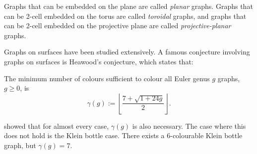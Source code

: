 Graphs that can be embedded on the plane are called \textit{planar} graphs. Graphs that can be 2-cell embedded on the torus are called \textit{toroidal} graphs, and graphs that can be 2-cell embedded on the projective plane are called \textit{projective-planar} graphs.


Graphs on surfaces have been studied extensively. A famous conjecture involving graphs on surfaces is Heawood's conjecture, which states that:
\begin{theorem}
	The minimum number of colours sufficient to colour all Euler genus $g$ graphs, $g \geq 0$, is
	\begin{equation*}
		\gamma(g) := \left\lfloor 
		\frac{7 + \sqrt{1 + 24g}}{2}
		\right\rfloor.
	\end{equation*}
\end{theorem}
\textcite{ringelMapColorTheorem1974} showed that for almost every case, $\gamma(g)$ is also necessary. The case where this does not hold is the Klein bottle case. There exists a 6-colourable Klein bottle graph, but $\gamma(g) = 7$. 